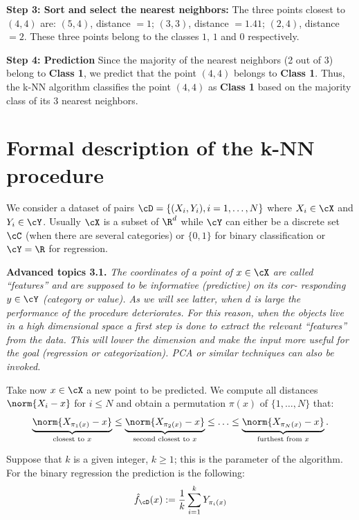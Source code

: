 \textbf{Step 3: Sort and select the nearest neighbors:} The three points closest
to $(4,4)$ are: $(5,4)$, distance $= 1$; $(3,3)$, distance $= 1.41$; $(2,4)$, distance $= 2$.
These three points belong to the classes $1$, $1$ and $0$ respectively.

\textbf{Step 4: Prediction} Since the majority of the nearest neighbors (2 out of 3)
belong to \textbf{Class 1}, we predict that the point $(4, 4)$ belongs to \textbf{Class 1}. Thus,
the k-NN algorithm classifies the point $(4, 4)$ as \textbf{Class 1} based on the majority
class of its 3 nearest neighbors.

\section{Formal description of the k-NN procedure}
\label{sec:ch3-formal}

We consider a dataset of pairs $\cD = \{(X_i, Y_i), i = 1, \ldots, N\}$ where $X_i \in \cX$ and
$Y_i \in \cY$. Usually $\cX$ is a subset of $\R^d$ while $\cY$ can either be a discrete set $\cC$
(when there are several categories) or $\{0,1\}$ for binary classification or $\cY = \R$
for regression.

\begin{tcolorbox}[advancedbox]
\textbf{Advanced topics 3.1.} \textit{The coordinates of a point of $x \in \cX$ are called
``features'' and are supposed to be informative (predictive) on its cor-
responding $y \in \cY$ (category or value). As we will see latter, when $d$
is large the performance of the procedure deteriorates. For this reason,
when the objects live in a high dimensional space a first step is done
to extract the relevant ``features'' from the data. This will lower the
dimension and make the input more useful for the goal (regression or
categorization). PCA or similar techniques can also be invoked.}
\end{tcolorbox}

Take now $x \in \cX$ a new point to be predicted. We compute all distances
$\norm{X_i - x}$ for $i \leq N$ and obtain a permutation $\pi(x)$ of $\{1, \ldots, N\}$ that:
\begin{equation}\label{eq:ch3-permutation}
\underbrace{\norm{X_{\pi_1(x)} - x}}_{\text{closest to } x}
\leq \underbrace{\norm{X_{\pi_2(x)} - x}}_{\text{second closest to } x}
\leq \ldots \leq \underbrace{\norm{X_{\pi_N(x)} - x}}_{\text{furthest from } x}.
\end{equation}

Suppose that $k$ is a given integer, $k \geq 1$; this is the parameter of the
algorithm. For the binary regression the prediction is the following:
\begin{equation}\label{eq:ch3-regression}
\hat{f}_{\cD}(x) := \frac{1}{k} \sum_{i=1}^{k} Y_{\pi_i(x)}
\end{equation}

